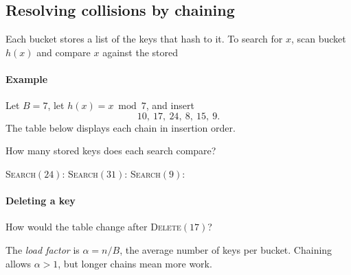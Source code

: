 \documentclass[11pt]{article}
\begin{document}
\newpage
\subsection*{Resolving collisions by chaining}
Each bucket stores a list of the keys that hash to it. To search for $x$, scan
bucket $h(x)$ and compare $x$ against the stored 

\paragraph{Example}
Let $B=7$, let $h(x)=x\bmod 7$, and insert
\begin{equation*}
    10,\ 17,\ 24,\ 8,\ 15,\ 9.
\end{equation*}
The table below displays each chain in insertion order.

\begin{center}
\end{center}

\begin{Qu}
    How many stored keys does each search compare?
    \begin{itemize}
        \aitem \textsc{Search}$(24)$: 
        \bitem \textsc{Search}$(31)$: 
        \citem \textsc{Search}$(9)$: 
    \end{itemize}
\end{Qu}

\paragraph{Deleting a key}
How would the table change after \textsc{Delete}$(17)$?
\vs{.7cm}

\vfill
The \emph{load factor} is $\alpha=n/B$, the average number of keys per bucket.
Chaining allows $\alpha>1$, but longer chains mean more work.
\end{document}
